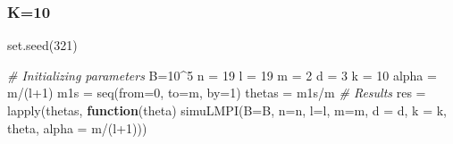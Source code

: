 \documentclass[
]{article}
\newenvironment{Shaded}{\begin{snugshade}}{\end{snugshade}}
\newcommand{\AttributeTok}[1]{\textcolor[rgb]{0.77,0.63,0.00}{#1}}
\newcommand{\CommentTok}[1]{\textcolor[rgb]{0.56,0.35,0.01}{\textit{#1}}}
\newcommand{\ControlFlowTok}[1]{\textcolor[rgb]{0.13,0.29,0.53}{\textbf{#1}}}
\newcommand{\DecValTok}[1]{\textcolor[rgb]{0.00,0.00,0.81}{#1}}
\newcommand{\FunctionTok}[1]{\textcolor[rgb]{0.00,0.00,0.00}{#1}}
\newcommand{\NormalTok}[1]{#1}
\newcommand{\OtherTok}[1]{\textcolor[rgb]{0.56,0.35,0.01}{#1}}
\newcommand{\SpecialCharTok}[1]{\textcolor[rgb]{0.00,0.00,0.00}{#1}}
\begin{document}
\hypertarget{k10}{%
\subsubsection{K=10}\label{k10}}

\begin{Shaded}
\begin{Highlighting}[]
\FunctionTok{set.seed}\NormalTok{(}\DecValTok{321}\NormalTok{)}

\CommentTok{\# Initializing parameters}
\NormalTok{B}\OtherTok{=}\DecValTok{10}\SpecialCharTok{\^{}}\DecValTok{5}
\NormalTok{n }\OtherTok{=} \DecValTok{19}
\NormalTok{l }\OtherTok{=} \DecValTok{19}
\NormalTok{m }\OtherTok{=} \DecValTok{2}
\NormalTok{d }\OtherTok{=} \DecValTok{3}
\NormalTok{k }\OtherTok{=} \DecValTok{10}
\NormalTok{alpha }\OtherTok{=}\NormalTok{ m}\SpecialCharTok{/}\NormalTok{(l}\SpecialCharTok{+}\DecValTok{1}\NormalTok{)}
\NormalTok{m1s }\OtherTok{=} \FunctionTok{seq}\NormalTok{(}\AttributeTok{from=}\DecValTok{0}\NormalTok{, }\AttributeTok{to=}\NormalTok{m, }\AttributeTok{by=}\DecValTok{1}\NormalTok{)}
\NormalTok{thetas }\OtherTok{=}\NormalTok{ m1s}\SpecialCharTok{/}\NormalTok{m}
\CommentTok{\# Results}
\NormalTok{res }\OtherTok{=} \FunctionTok{lapply}\NormalTok{(thetas, }\ControlFlowTok{function}\NormalTok{(theta) }\FunctionTok{simuLMPI}\NormalTok{(}\AttributeTok{B=}\NormalTok{B, }\AttributeTok{n=}\NormalTok{n, }\AttributeTok{l=}\NormalTok{l, }\AttributeTok{m=}\NormalTok{m, }\AttributeTok{d =}\NormalTok{ d, }
                                              \AttributeTok{k =}\NormalTok{ k, theta, }\AttributeTok{alpha =}\NormalTok{ m}\SpecialCharTok{/}\NormalTok{(l}\SpecialCharTok{+}\DecValTok{1}\NormalTok{)))}


\end{Highlighting}
\end{Shaded}
\end{document}

